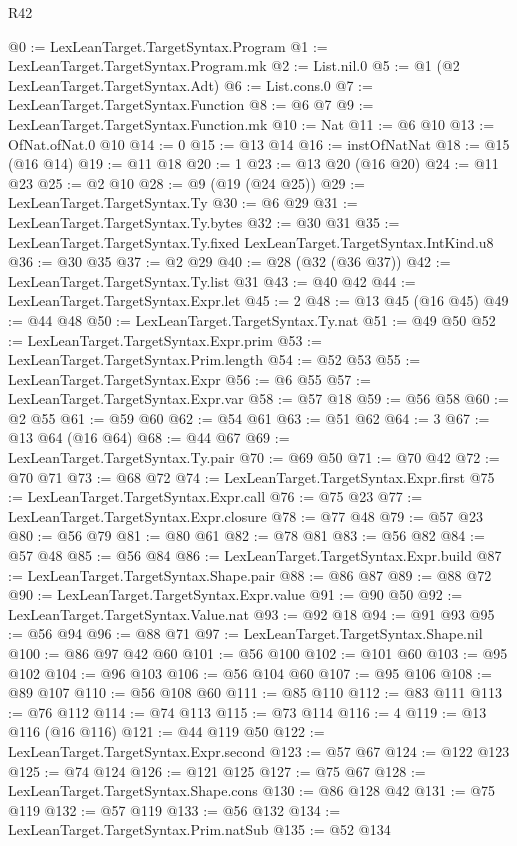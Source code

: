 \begin{lexlean}{R42}
\begin{coremodule}
@0 := LexLeanTarget.TargetSyntax.Program
@1 := LexLeanTarget.TargetSyntax.Program.mk
@2 := List.nil.{0}
@5 := @1 (@2 LexLeanTarget.TargetSyntax.Adt)
@6 := List.cons.{0}
@7 := LexLeanTarget.TargetSyntax.Function
@8 := @6 @7
@9 := LexLeanTarget.TargetSyntax.Function.mk
@10 := Nat
@11 := @6 @10
@13 := OfNat.ofNat.{0} @10
@14 := 0
@15 := @13 @14
@16 := instOfNatNat
@18 := @15 (@16 @14)
@19 := @11 @18
@20 := 1
@23 := @13 @20 (@16 @20)
@24 := @11 @23
@25 := @2 @10
@28 := @9 (@19 (@24 @25))
@29 := LexLeanTarget.TargetSyntax.Ty
@30 := @6 @29
@31 := LexLeanTarget.TargetSyntax.Ty.bytes
@32 := @30 @31
@35 := LexLeanTarget.TargetSyntax.Ty.fixed LexLeanTarget.TargetSyntax.IntKind.u8
@36 := @30 @35
@37 := @2 @29
@40 := @28 (@32 (@36 @37))
@42 := LexLeanTarget.TargetSyntax.Ty.list @31
@43 := @40 @42
@44 := LexLeanTarget.TargetSyntax.Expr.let
@45 := 2
@48 := @13 @45 (@16 @45)
@49 := @44 @48
@50 := LexLeanTarget.TargetSyntax.Ty.nat
@51 := @49 @50
@52 := LexLeanTarget.TargetSyntax.Expr.prim
@53 := LexLeanTarget.TargetSyntax.Prim.length
@54 := @52 @53
@55 := LexLeanTarget.TargetSyntax.Expr
@56 := @6 @55
@57 := LexLeanTarget.TargetSyntax.Expr.var
@58 := @57 @18
@59 := @56 @58
@60 := @2 @55
@61 := @59 @60
@62 := @54 @61
@63 := @51 @62
@64 := 3
@67 := @13 @64 (@16 @64)
@68 := @44 @67
@69 := LexLeanTarget.TargetSyntax.Ty.pair
@70 := @69 @50
@71 := @70 @42
@72 := @70 @71
@73 := @68 @72
@74 := LexLeanTarget.TargetSyntax.Expr.first
@75 := LexLeanTarget.TargetSyntax.Expr.call
@76 := @75 @23
@77 := LexLeanTarget.TargetSyntax.Expr.closure
@78 := @77 @48
@79 := @57 @23
@80 := @56 @79
@81 := @80 @61
@82 := @78 @81
@83 := @56 @82
@84 := @57 @48
@85 := @56 @84
@86 := LexLeanTarget.TargetSyntax.Expr.build
@87 := LexLeanTarget.TargetSyntax.Shape.pair
@88 := @86 @87
@89 := @88 @72
@90 := LexLeanTarget.TargetSyntax.Expr.value
@91 := @90 @50
@92 := LexLeanTarget.TargetSyntax.Value.nat
@93 := @92 @18
@94 := @91 @93
@95 := @56 @94
@96 := @88 @71
@97 := LexLeanTarget.TargetSyntax.Shape.nil
@100 := @86 @97 @42 @60
@101 := @56 @100
@102 := @101 @60
@103 := @95 @102
@104 := @96 @103
@106 := @56 @104 @60
@107 := @95 @106
@108 := @89 @107
@110 := @56 @108 @60
@111 := @85 @110
@112 := @83 @111
@113 := @76 @112
@114 := @74 @113
@115 := @73 @114
@116 := 4
@119 := @13 @116 (@16 @116)
@121 := @44 @119 @50
@122 := LexLeanTarget.TargetSyntax.Expr.second
@123 := @57 @67
@124 := @122 @123
@125 := @74 @124
@126 := @121 @125
@127 := @75 @67
@128 := LexLeanTarget.TargetSyntax.Shape.cons
@130 := @86 @128 @42
@131 := @75 @119
@132 := @57 @119
@133 := @56 @132
@134 := LexLeanTarget.TargetSyntax.Prim.natSub
@135 := @52 @134

\end{coremodule}
\end{lexlean}
